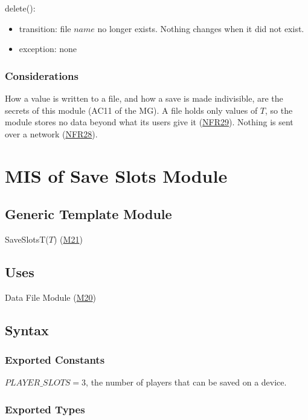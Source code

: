 \documentclass[10pt, titlepage]{article}
\newcommand{\srsurl}{https://team-hindsight.github.io/ophthamology-game/SRS/SRS.pdf}
\newcommand{\srsitemref}[2]{\href{\srsurl\#nameddest=#1}{#2}}
\newcommand{\misref}[2]{\hyperref[mis:#1]{M#2}}
\newcommand{\T}[1]{\mathit{#1}}          %
\begin{document}
\noindent delete():
\begin{itemize}
\item transition: file $\T{name}$ no longer exists. Nothing changes when it
  did not exist.
\item exception: none
\end{itemize}

\subsubsection{Considerations}

How a value is written to a file, and how a save is made indivisible, are the
secrets of this module (AC11 of the MG). A file holds only values of $T$, so
the module stores no data beyond what its users give it
(\srsitemref{NFR_Minimization}{NFR29}). Nothing is sent over a network
(\srsitemref{NFR_Privacy}{NFR28}).

\newpage
\section{MIS of Save Slots Module} \label{mis:Slots}

\subsection{Generic Template Module}

SaveSlotsT($T$) (\misref{Slots}{21})

\subsection{Uses}

Data File Module (\misref{DataFile}{20})

\subsection{Syntax}

\subsubsection{Exported Constants}

$\T{PLAYER\_SLOTS} = 3$, the number of players that can be saved on a device.

\subsubsection{Exported Types}
\end{document}
